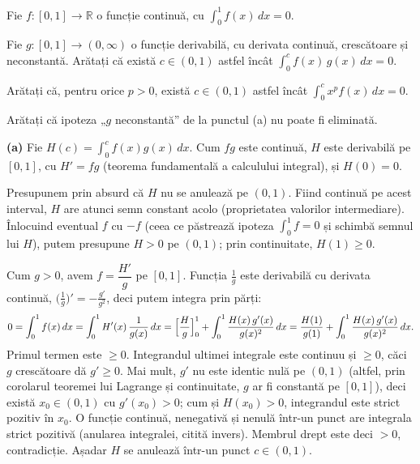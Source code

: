 Fie $f:[0,1]\to\mathbb{R}$ o funcție continuă, cu $\displaystyle\int_0^1 f(x)\,dx=0$.
\begin{parti}
  \item Fie $g:[0,1]\to(0,\infty)$ o funcție derivabilă, cu derivata continuă,
        crescătoare și neconstantă. Arătați că există $c\in(0,1)$ astfel încât
        $\displaystyle\int_0^c f(x)\,g(x)\,dx=0$.
  \item Arătați că, pentru orice $p>0$, există $c\in(0,1)$ astfel încât
        $\displaystyle\int_0^c x^{p}f(x)\,dx=0$.
  \item Arătați că ipoteza „$g$ neconstantă'' de la punctul (a) nu poate fi eliminată.
\end{parti}
\sol \textbf{(a)} Fie $H(c)=\displaystyle\int_0^c f(x)g(x)\,dx$. Cum $fg$ este continuă, $H$ este derivabilă pe $[0,1]$, cu $H'=fg$ (teorema fundamentală a calculului integral), și $H(0)=0$.

Presupunem prin absurd că $H$ nu se anulează pe $(0,1)$. Fiind continuă pe acest interval, $H$ are atunci semn constant acolo (proprietatea valorilor intermediare). Înlocuind eventual $f$ cu $-f$ (ceea ce păstrează ipoteza $\int_0^1 f=0$ și schimbă semnul lui $H$), putem presupune $H>0$ pe $(0,1)$; prin continuitate, $H(1)\ge0$.

Cum $g>0$, avem $f=\dfrac{H'}{g}$ pe $[0,1]$. Funcția $\frac1g$ este derivabilă cu derivata continuă, $\bigl(\frac1g\bigr)'=-\frac{g'}{g^{2}}$, deci putem integra prin părți:
\[ 0=\int_0^1 f(x)\,dx=\int_0^1 H'(x)\,\frac{1}{g(x)}\,dx=\Bigl[\frac{H}{g}\Bigr]_0^1+\int_0^1\frac{H(x)\,g'(x)}{g(x)^2}\,dx=\frac{H(1)}{g(1)}+\int_0^1\frac{H(x)\,g'(x)}{g(x)^2}\,dx . \]
Primul termen este $\ge0$. Integrandul ultimei integrale este continuu și $\ge0$, căci $g$ crescătoare dă $g'\ge0$. Mai mult, $g'$ nu este identic nulă pe $(0,1)$ (altfel, prin corolarul teoremei lui Lagrange și continuitate, $g$ ar fi constantă pe $[0,1]$), deci există $x_0\in(0,1)$ cu $g'(x_0)>0$; cum și $H(x_0)>0$, integrandul este strict pozitiv în $x_0$. O funcție continuă, nenegativă și nenulă într-un punct are integrala strict pozitivă (anularea integralei, citită invers). Membrul drept este deci $>0$, contradicție. Așadar $H$ se anulează într-un punct $c\in(0,1)$.

